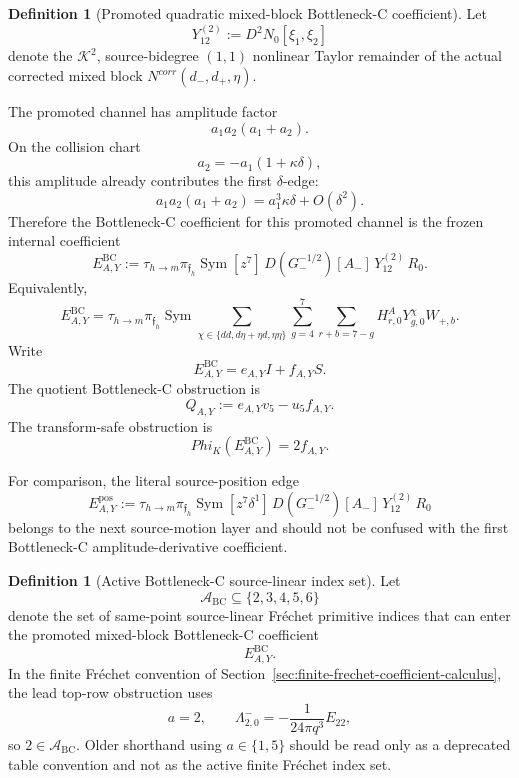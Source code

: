 \documentclass[11pt,a4paper]{amsart}
\def\Phi{Phi}%
\def\corr{corr}%
\theoremstyle{plain}
\theoremstyle{definition}
\newtheorem{definition}[theorem]{Definition}
\newcommand{\corr}{\mathrm{corr}}
\begin{document}
\begin{definition}[Promoted quadratic mixed-block Bottleneck-C coefficient]
\label{def:promoted-quadratic-mixed-block-bc-coefficient}
Let
\[
Y_{12}^{(2)}:=D^2N_0[\xi_1,\xi_2]
\]
denote the \(\mathcal K^2\), source-bidegree \((1,1)\) nonlinear Taylor
remainder of the actual corrected mixed block
\(N^{\corr}(d_-,d_+,\eta)\).

The promoted channel has amplitude factor
\[
a_1a_2(a_1+a_2).
\]
On the collision chart
\[
a_2=-a_1(1+\kappa\delta),
\]
this amplitude already contributes the first \(\delta\)-edge:
\[
a_1a_2(a_1+a_2)
=
a_1^3\kappa\delta+O(\delta^2).
\]
Therefore the Bottleneck-C coefficient for this promoted channel is the
frozen internal coefficient
\[
E_{A,Y}^{\mathrm{BC}}
:=
\tau_{h\to m}\pi_{\mathfrak f_h}
\operatorname{Sym}
[z^7]\,
D(G_-^{-1/2})[A_-]\,
Y_{12}^{(2)}\,
R_0.
\]
Equivalently,
\[
E_{A,Y}^{\mathrm{BC}}
=
\tau_{h\to m}\pi_{\mathfrak f_h}
\operatorname{Sym}
\sum_{\chi\in\{dd,d\eta+\eta d,\eta\eta\}}
\sum_{g=4}^{7}
\sum_{r+b=7-g}
H^A_{r,0}Y^\chi_{g,0}W_{+,b}.
\]
Write
\[
E_{A,Y}^{\mathrm{BC}}
=
e_{A,Y}I+f_{A,Y}S.
\]
The quotient Bottleneck-C obstruction is
\[
Q_{A,Y}:=e_{A,Y}v_5-u_5f_{A,Y}.
\]
The transform-safe obstruction is
\[
\Phi_K(E_{A,Y}^{\mathrm{BC}})=2f_{A,Y}.
\]

For comparison, the literal source-position edge
\[
E_{A,Y}^{\mathrm{pos}}
:=
\tau_{h\to m}\pi_{\mathfrak f_h}
\operatorname{Sym}
[z^7\delta^1]\,
D(G_-^{-1/2})[A_-]\,
Y_{12}^{(2)}\,
R_0
\]
belongs to the next source-motion layer and should not be confused with the
first Bottleneck-C amplitude-derivative coefficient.
\end{definition}

\begin{definition}[Active Bottleneck-C source-linear index set]
\label{def:active-bc-source-linear-index-set}
Let
\[
\mathcal A_{\mathrm{BC}}
\subseteq\{2,3,4,5,6\}
\]
denote the set of same-point source-linear Fr\'echet primitive indices that
can enter the promoted mixed-block Bottleneck-C coefficient
\[
E_{A,Y}^{\mathrm{BC}}.
\]
In the finite Fr\'echet convention of
Section~\ref{sec:finite-frechet-coefficient-calculus}, the lead top-row
obstruction uses
\[
a=2,
\qquad
\Lambda^-_{2,0}
=
-\frac{1}{24\pi q^3}E_{22},
\]
so \(2\in\mathcal A_{\mathrm{BC}}\).  Older shorthand using
\(a\in\{1,5\}\) should be read only as a deprecated table convention and not
as the active finite Fr\'echet index set.
\end{definition}
\end{document}
